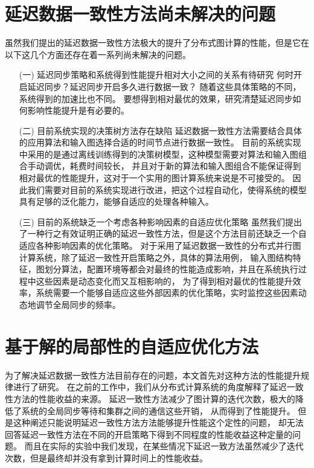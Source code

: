 \section{延迟数据一致性方法尚未解决的问题}
虽然我们提出的延迟数据一致性方法极大的提升了分布式图计算的性能，但是它在以下这几个方面还存在着一系列尚未解决的问题。    
\begin{enumerate}      
  \item[(一)] 延迟同步策略和系统得到性能提升相对大小之间的关系有待研究 \newline\indent
    何时开启延迟同步？延迟同步开启多久进行数据一致？
    随着这些具体策略的不同，系统得到的加速比也不同。
    要想得到相对最优的效果，研究清楚延迟同步如何影响性能提升是有必要的。

  \item[(二)] 目前系统实现的决策树方法存在缺陷 \newline\indent
    延迟数据一致性方法需要结合具体的应用算法和输入图选择合适的时间节点进行数据一致性。
    目前的系统实现中采用的是通过离线训练得到的决策树模型，这种模型需要对算法和输入图组合手动调优，耗费时间较长，
    并且对于新的算法和输入图组合不能保证得到相对最优的性能提升，这对于一个实用的图计算系统来说是不可接受的。
    因此我们需要对目前的系统实现进行改进，把这个过程自动化，使得系统的模型具有足够的泛化能力，能够自适应的处理各种输入。          

  \item[(三)] 目前的系统缺乏一个考虑各种影响因素的自适应优化策略 \newline\indent
    虽然我们提出了一种行之有效证明正确的延迟一致性方法，但是这个方法目前还缺乏一个自适应各种影响因素的优化策略。
    对于采用了延迟数据一致性的分布式并行图计算系统，除了延迟一致性开启策略之外，具体的算法用例，
    输入图结构特征，图划分算法，配置环境等都会对最终的性能造成影响，并且在系统执行过程中这些因素是动态变化而又互相影响的，
    为了得到相对最优的性能提升效率，系统需要一个能够自适应这些外部因素的优化策略，实时监控这些因素动态地调节全局同步的频率。          
\end{enumerate}
\section{基于解的局部性的自适应优化方法}
为了解决延迟数据一致性方法目前存在的问题，本文首先对这种方法的性能提升规律进行了研究。
在之前的工作中，我们从分布式计算系统的角度解释了延迟一致性方法的性能收益的来源。
延迟一致性方法减少了图计算的迭代次数，极大的降低了系统的全局同步等待和集群之间的通信这些开销，
从而得到了性能提升。
但是这种阐述只能说明延迟一致性方法方法能够提升性能这个定性的问题，
却无法回答延迟一致性方法在不同的开启策略下得到不同程度的性能收益这种定量的问题。
而且在实际的实验中我们发现，在某些情况下延迟一致方法虽然减少了迭代次数，但是最终却并没有拿到计算时间上的性能收益。

